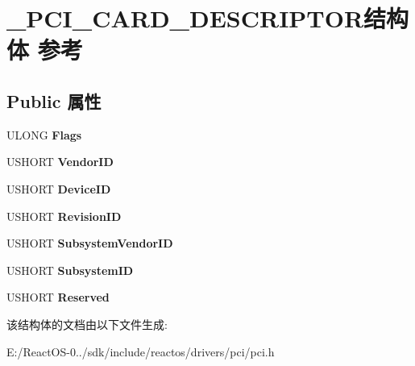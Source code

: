 \hypertarget{struct___p_c_i___c_a_r_d___d_e_s_c_r_i_p_t_o_r}{}\section{\+\_\+\+P\+C\+I\+\_\+\+C\+A\+R\+D\+\_\+\+D\+E\+S\+C\+R\+I\+P\+T\+O\+R结构体 参考}
\label{struct___p_c_i___c_a_r_d___d_e_s_c_r_i_p_t_o_r}
\subsection*{Public 属性}
\begin{DoxyCompactItemize}
\item 
\mbox{\label{struct___p_c_i___c_a_r_d___d_e_s_c_r_i_p_t_o_r_a3ab345807947a725a8263dddf7cbe4f1}} 
U\+L\+O\+NG {\bfseries Flags}
\item 
\mbox{\label{struct___p_c_i___c_a_r_d___d_e_s_c_r_i_p_t_o_r_a19aca29d2c4b33dc5ad3fd401650e39a}} 
U\+S\+H\+O\+RT {\bfseries Vendor\+ID}
\item 
\mbox{\label{struct___p_c_i___c_a_r_d___d_e_s_c_r_i_p_t_o_r_a673aedae2a64796aff294c9575702148}} 
U\+S\+H\+O\+RT {\bfseries Device\+ID}
\item 
\mbox{\label{struct___p_c_i___c_a_r_d___d_e_s_c_r_i_p_t_o_r_af09b5acb97517b36142299e1d031a550}} 
U\+S\+H\+O\+RT {\bfseries Revision\+ID}
\item 
\mbox{\label{struct___p_c_i___c_a_r_d___d_e_s_c_r_i_p_t_o_r_acc8d739ad35b4aceb9fe7f01be78f97e}} 
U\+S\+H\+O\+RT {\bfseries Subsystem\+Vendor\+ID}
\item 
\mbox{\label{struct___p_c_i___c_a_r_d___d_e_s_c_r_i_p_t_o_r_a585b3843b0fdd40286956e21ec8a04aa}} 
U\+S\+H\+O\+RT {\bfseries Subsystem\+ID}
\item 
\mbox{\label{struct___p_c_i___c_a_r_d___d_e_s_c_r_i_p_t_o_r_ac7e37efe9a3e2aaff0d372b7336347bc}} 
U\+S\+H\+O\+RT {\bfseries Reserved}
\end{DoxyCompactItemize}


该结构体的文档由以下文件生成\+:\begin{DoxyCompactItemize}
\item 
E\+:/\+React\+O\+S-\/0../sdk/include/reactos/drivers/pci/pci.\+h\end{DoxyCompactItemize}
